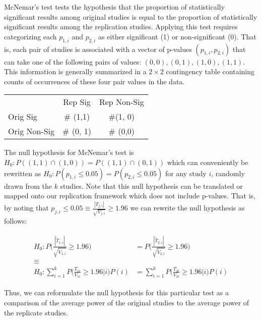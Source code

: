\documentclass{article}
\begin{document}
McNemar's test tests the hypothesis that the proportion of statistically significant results among original studies is equal to the proportion of statistically significant results among the replication studies. Applying this test requires categorizing each $p_{1,i}$ and $p_{2,i}$ as either significant (1) or non-significant (0). That is, each pair of studies is associated with a vector of p-values $(p_{1,i}, p_{2,i})$ that can take one of the following pairs of values: $(0,0), (0,1), (1,0), (1,1)$. This information is generally summarized in a $2\times 2$ contingency table containing counts of occurrences of these four pair values in the data.

\begin{table}[h!]
\centering
\begin{tabular}{l c c }
& Rep Sig & Rep Non-Sig \\
Orig Sig & \# (1,1) & \#(1, 0) \\
Orig Non-Sig & \# (0, 1) & \# (0,0) \\
\end{tabular}
\end{table}

The null hypothesis for McNemar's test is $H_0: P((1,1) \cap (1,0)) = P((1,1) \cap (0,1))$ which can conveniently be rewritten as $H_0: P(p_{1,i} \leq 0.05) = P(p_{2,i} \leq 0.05) $ for any study $i$, randomly drawn from the $k$ studies. Note that this null hypothesis can be translated or mapped onto our replication framework which does not include p-values. That is, by noting that $p_{j,i} \leq 0.05 \equiv \frac{|T_{j,i}|}{\sqrt{V_{j,i}}} \geq 1.96$ we can rewrite the null hypothesis as follows:

\begin{align}
\begin{split}
H_0:  P \Big(\frac{| \tilde{T}_{1,i} |}{\sqrt{\tilde{V}_{1,i}}} \geq 1.96 \Big) &= P \Big(\frac{| \tilde{T}_{2,i} | }{\sqrt{\tilde{V}_{2,i}}} \geq 1.96 \Big) \\
\equiv \\
H_0 : \sum\limits_{i=1}^k P \Big ( \frac{T_{1i}}{V_{1i}} \geq 1.96 | i \Big ) P(i) &= \sum\limits_{i=1}^k P \Big ( \frac{T_{2i}}{V_{2i}} \geq 1.96 | i \Big ) P(i)
\end{split} 
\end{align}
 
Thus, we can reformulate the null hypothesis for this particular test as a comparison of the average power of the original studies to the average power of the replicate studies. 
\end{document}
